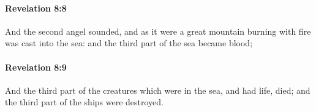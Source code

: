 		\paragraph{Revelation 8:8} %
			\label{REVELATIONNT-8-8}

			And the second angel sounded, and as it were a great mountain burning with fire was cast into the sea: and the third part of the sea became blood;

			\begin{framed}
			\scriptsize
				\begin{compactdesc}
					\item[SBLG] 
				\end{compactdesc}
			\end{framed}

		\paragraph{Revelation 8:9} %
			\label{REVELATIONNT-8-9}

			And the third part of the creatures which were in the sea, and had life, died; and the third part of the ships were destroyed.

